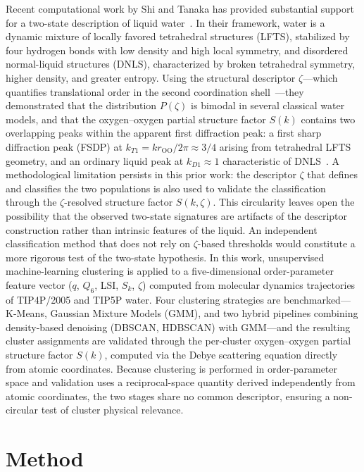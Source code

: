 \documentclass[aps, amsmath,amssymb, reprint, twocolumn,notitlepage,superscriptaddress]{revtex4-2}
\begin{document}
Recent computational work by Shi and Tanaka has provided substantial support for a two-state description of liquid water~\cite{shi_direct_2020, russo_understanding_2014, shi_microscopic_2018}. In their framework, water is a dynamic mixture of locally favored tetrahedral structures (LFTS), stabilized by four hydrogen bonds with low density and high local symmetry, and disordered normal-liquid structures (DNLS), characterized by broken tetrahedral symmetry, higher density, and greater entropy. Using the structural descriptor $\zeta$---which quantifies translational order in the second coordination shell~\cite{russo_understanding_2014}---they demonstrated that the distribution $P(\zeta)$ is bimodal in several classical water models, and that the oxygen--oxygen partial structure factor $S(k)$ contains two overlapping peaks within the apparent first diffraction peak: a first sharp diffraction peak (FSDP) at $k_{T1} = kr_{\mathrm{OO}}/2\pi \approx 3/4$ arising from tetrahedral LFTS geometry, and an ordinary liquid peak at $k_{D1} \approx 1$ characteristic of DNLS~\cite{shi_direct_2020, shi-2019}. A methodological limitation persists in this prior work: the descriptor $\zeta$ that defines and classifies the two populations is also used to validate the classification through the $\zeta$-resolved structure factor $S(k, \zeta)$. This circularity leaves open the possibility that the observed two-state signatures are artifacts of the descriptor construction rather than intrinsic features of the liquid. An independent classification method that does not rely on $\zeta$-based thresholds would constitute a more rigorous test of the two-state hypothesis. In this work, unsupervised machine-learning clustering is applied to a five-dimensional order-parameter feature vector ($q$, $Q_6$, LSI, $S_k$, $\zeta$) computed from molecular dynamics trajectories of TIP4P/2005 and TIP5P water. Four clustering strategies are benchmarked---K-Means, Gaussian Mixture Models (GMM), and two hybrid pipelines combining density-based denoising (DBSCAN, HDBSCAN) with GMM---and the resulting cluster assignments are validated through the per-cluster oxygen--oxygen partial structure factor $S(k)$, computed via the Debye scattering equation directly from atomic coordinates. Because clustering is performed in order-parameter space and validation uses a reciprocal-space quantity derived independently from atomic coordinates, the two stages share no common descriptor, ensuring a non-circular test of cluster physical relevance.

\section{Method}
\end{document}
